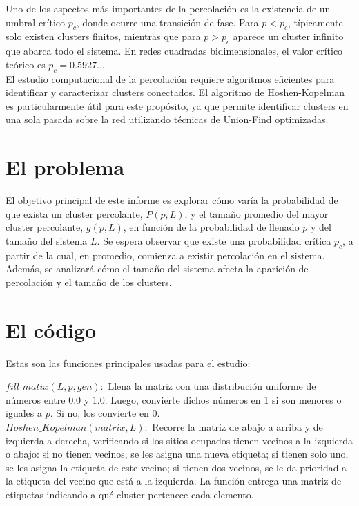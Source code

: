 \documentclass[10pt,twocolumn]{article}
\begin{document}
    Uno de los aspectos más importantes de la percolación es la existencia de un umbral crítico $p_c$, donde ocurre una transición de fase. 
    Para $p < p_c$, típicamente solo existen clusters finitos, mientras que para $p > p_c$ aparece un cluster infinito que abarca todo el 
    sistema. En redes cuadradas bidimensionales, el valor crítico teórico es $p_c = 0.5927...$.\\

    El estudio computacional de la percolación requiere algoritmos eficientes para identificar y caracterizar clusters conectados. El 
    algoritmo de Hoshen-Kopelman \cite{hoshen1976percolation} es particularmente útil para este propósito, ya que permite identificar 
    clusters en una sola pasada sobre la red utilizando técnicas de Union-Find optimizadas.\\
    
\section{El problema}
El objetivo principal de este informe es explorar cómo varía la probabilidad de que exista un cluster percolante, 
\( P(p, L) \), y el tamaño promedio del mayor cluster percolante, \( g(p, L) \), en función de la probabilidad de llenado \( p \) y del tamaño del sistema \( L \). Se espera observar que existe una probabilidad crítica \( p_c \), a partir de la cual, en promedio, comienza a existir percolación en el sistema. Además, se analizará cómo el tamaño del sistema afecta la aparición de percolación y el tamaño de los clusters.

    
\section{El código}
    Estas son las funciones principales usadas para el estudio:

    $fill\_matix(L, p, gen):$ Llena la matriz con una distribución uniforme de números entre 0.0 y 1.0. Luego, convierte
    dichos números en 1 si son menores o iguales a $p$. Si no, los convierte en 0.\\ 

    $Hoshen\_Kopelman(matrix, L):$ Recorre la matriz de abajo a arriba y de izquierda a derecha, verificando si los sitios ocupados tienen vecinos a la izquierda o abajo: si no tienen vecinos, se les asigna una nueva etiqueta; si tienen solo uno, se les asigna la etiqueta de este vecino; si tienen dos vecinos, se le da prioridad a la etiqueta del vecino que está a la izquierda.
    La función entrega una matriz de etiquetas indicando a qué cluster pertenece cada elemento. \\
\end{document}
